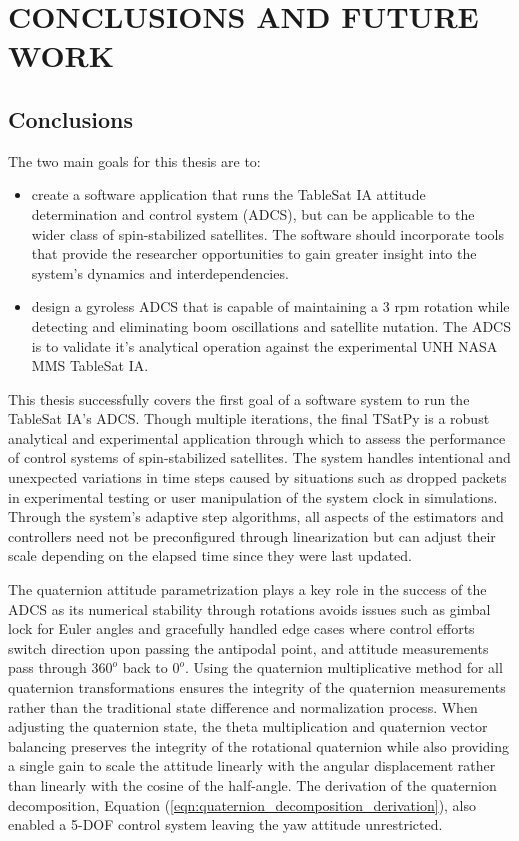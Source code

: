 \chapter{CONCLUSIONS AND FUTURE WORK}
\label{chap:Conclusions}

\section{Conclusions}

The two main goals for this thesis are to:

\begin{itemize}
\item create a software application that runs the TableSat IA attitude determination and control system (ADCS), but can be applicable to the wider class of spin-stabilized satellites.  The software should incorporate tools that provide the researcher opportunities to gain greater insight into the system's dynamics and interdependencies.
\item design a gyroless ADCS that is capable of maintaining a 3 rpm rotation while detecting and eliminating boom oscillations and satellite nutation.  The ADCS is to validate it's analytical operation against the experimental UNH NASA MMS TableSat IA.
\end{itemize}

This thesis successfully covers the first goal of a software system to run the TableSat IA's ADCS.  Though multiple iterations, the final TSatPy is a robust analytical and experimental application through which to assess the performance of control systems of spin-stabilized satellites.  The system handles intentional and unexpected variations in time steps caused by situations such as dropped packets in experimental testing or user manipulation of the system clock in simulations.  Through the system's adaptive step algorithms, all aspects of the estimators and controllers need not be preconfigured through linearization but can adjust their scale depending on the elapsed time since they were last updated.

The quaternion attitude parametrization plays a key role in the success of the ADCS as its numerical stability through rotations avoids issues such as gimbal lock for Euler angles and gracefully handled edge cases where control efforts switch direction upon passing the antipodal point, and attitude measurements pass through $360^o$ back to $0^o$.  Using the quaternion multiplicative method for all quaternion transformations ensures the integrity of the quaternion measurements rather than the traditional state difference and normalization process.  When adjusting the quaternion state, the theta multiplication and quaternion vector balancing preserves the integrity of the rotational quaternion while also providing a single gain to scale the attitude linearly with the angular displacement rather than linearly with the cosine of the half-angle.  The derivation of the quaternion decomposition, Equation (\ref{eqn:quaternion_decomposition_derivation}), also enabled a 5-DOF control system leaving the yaw attitude unrestricted.

